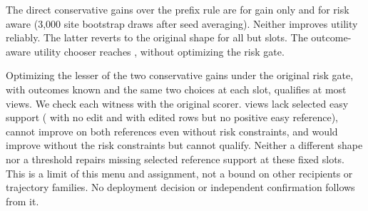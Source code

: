 The direct conservative gains over the prefix rule are
\ShapeGainEffect{} for gain only and \ShapeRiskEffect{} for risk aware
(3,000 site bootstrap draws after seed averaging). Neither improves
utility reliably. The latter reverts to the original shape for all but
\ShapeRiskChoices{} slots. The outcome-aware utility chooser reaches
\ShapeOracleEffect{}, without optimizing the risk gate.

Optimizing the lesser of the two conservative gains under the original
risk gate, with outcomes known and the same two choices at each slot,
qualifies at most \ShapeCapacity{} views. We check each witness with the
original scorer. \ShapeUndefined{} views lack selected easy support
(\ShapeNoEdit{} with no edit and \ShapeNoEasy{} with edited rows but no
positive easy reference), \ShapeUtilityMissing{} cannot improve on both
references even without risk constraints, and \ShapeRiskBlocks{} would
improve without the risk constraints but cannot qualify. Neither a
different shape nor a threshold repairs missing selected reference
support at these fixed slots. This is a limit of this menu and
assignment, not a bound on other recipients or trajectory families.
No deployment decision or independent confirmation follows from it.
